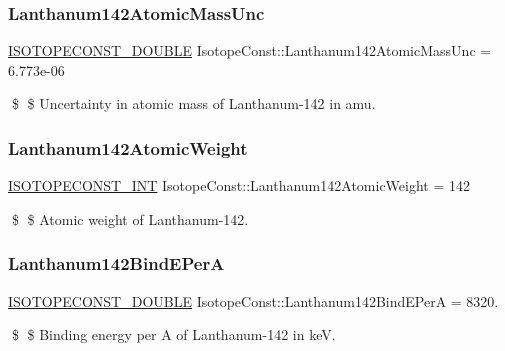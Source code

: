 \subsubsection{\texorpdfstring{Lanthanum142\+Atomic\+Mass\+Unc}{Lanthanum142AtomicMassUnc}}
{\footnotesize\ttfamily \mbox{\hyperlink{group___isotope_const-_macros_ga8f45a7272ce02c0b4c65c44636ed719a}{I\+S\+O\+T\+O\+P\+E\+C\+O\+N\+S\+T\+\_\+\+D\+O\+U\+B\+LE}} Isotope\+Const\+::\+Lanthanum142\+Atomic\+Mass\+Unc = 6.\+773e-\/06}

\$ \$ Uncertainty in atomic mass of Lanthanum-\/142 in amu. \mbox{\label{group___isotope_const-_lanthanum-_la142_gab05e800c0f8cc345970c3a7cc0f45b7e}} 
\subsubsection{\texorpdfstring{Lanthanum142\+Atomic\+Weight}{Lanthanum142AtomicWeight}}
{\footnotesize\ttfamily \mbox{\hyperlink{group___isotope_const-_macros_ga5f18360b3e99483a35c32d789e62621c}{I\+S\+O\+T\+O\+P\+E\+C\+O\+N\+S\+T\+\_\+\+I\+NT}} Isotope\+Const\+::\+Lanthanum142\+Atomic\+Weight = 142}

\$ \$ Atomic weight of Lanthanum-\/142. \mbox{\label{group___isotope_const-_lanthanum-_la142_ga75215195c4631e69b6a285336af6b0d7}} 
\subsubsection{\texorpdfstring{Lanthanum142\+Bind\+E\+PerA}{Lanthanum142BindEPerA}}
{\footnotesize\ttfamily \mbox{\hyperlink{group___isotope_const-_macros_ga8f45a7272ce02c0b4c65c44636ed719a}{I\+S\+O\+T\+O\+P\+E\+C\+O\+N\+S\+T\+\_\+\+D\+O\+U\+B\+LE}} Isotope\+Const\+::\+Lanthanum142\+Bind\+E\+PerA = 8320.}

\$ \$ Binding energy per A of Lanthanum-\/142 in keV. \mbox{\label{group___isotope_const-_lanthanum-_la142_gaac72fb1bbe6c0ebf09f1eba825ffe382}} 
